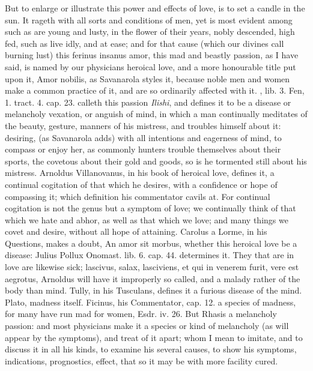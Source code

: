 But to enlarge or illustrate this power and effects of love, is to set
a candle in the sun. It rageth with all sorts and conditions of
men, yet is most evident among such as are young and lusty, in the
flower of their years, nobly descended, high fed, such as live idly,
and at ease; and for that cause (which our divines call burning lust)
this ferinus insanus amor, this mad and beastly passion, as I
have said, is named by our physicians heroical love, and a more
honourable title put upon it, Amor nobilis, as Savanarola styles
it, because noble men and women make a common practice of it, and are
so ordinarily affected with it. \Avicenna{}, lib. 3. Fen, 1. tract. 4.
cap. 23. calleth this passion \emph{Ilishi}, and defines it to be a
disease or melancholy vexation, or anguish of mind, in which a man
continually meditates of the beauty, gesture, manners of his mistress,
and troubles himself about it: desiring, (as Savanarola adds) with all
intentions and eagerness of mind, to compass or enjoy her, as
commonly hunters trouble themselves about their sports, the covetous
about their gold and goods, so is he tormented still about his
mistress. Arnoldus Villanovanus, in his book of heroical love, defines
it, a continual cogitation of that which he desires, with a
confidence or hope of compassing it; which definition his commentator
cavils at. For continual cogitation is not the genus but a symptom of
love; we continually think of that which we hate and abhor, as well as
that which we love; and many things we covet and desire, without all
hope of attaining. Carolus a Lorme, in his Questions, makes a doubt, An
amor sit morbus, whether this heroical love be a disease: Julius Pollux
Onomast. lib. 6. cap. 44. determines it. They that are in love are
likewise sick; lascivus, salax, lasciviens, et qui in venerem
furit, vere est aegrotus, Arnoldus will have it improperly so called,
and a malady rather of the body than mind. Tully, in his Tusculans,
defines it a furious disease of the mind. Plato, madness itself.
Ficinus, his Commentator, cap. 12. a species of madness, for many have
run mad for women, Esdr. iv. 26. But Rhasis a melancholy passion:
and most physicians make it a species or kind of melancholy (as will
appear by the symptoms), and treat of it apart; whom I mean to imitate,
and to discuss it in all his kinds, to examine his several causes, to
show his symptoms, indications, prognostics, effect, that so it may be
with more facility cured.

